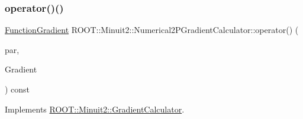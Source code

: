 \mbox{\label{classROOT_1_1Minuit2_1_1Numerical2PGradientCalculator_a89c825ba34455277290940fa62fc5321}} 
\subsubsection{\texorpdfstring{operator()()}{operator()()}\hspace{0.1cm}{\footnotesize\ttfamily [7/9]}}
{\footnotesize\ttfamily \mbox{\hyperlink{classROOT_1_1Minuit2_1_1FunctionGradient}{Function\+Gradient}} R\+O\+O\+T\+::\+Minuit2\+::\+Numerical2\+P\+Gradient\+Calculator\+::operator() (\begin{DoxyParamCaption}\item[{const \mbox{\hyperlink{classROOT_1_1Minuit2_1_1MinimumParameters}{Minimum\+Parameters}} \&}]{par,  }\item[{const \mbox{\hyperlink{classROOT_1_1Minuit2_1_1FunctionGradient}{Function\+Gradient}} \&}]{Gradient }\end{DoxyParamCaption}) const\hspace{0.3cm}{\ttfamily [virtual]}}



Implements \mbox{\hyperlink{classROOT_1_1Minuit2_1_1GradientCalculator_a1809c1e8a89d32aabf7835e9690c2916}{R\+O\+O\+T\+::\+Minuit2\+::\+Gradient\+Calculator}}.


